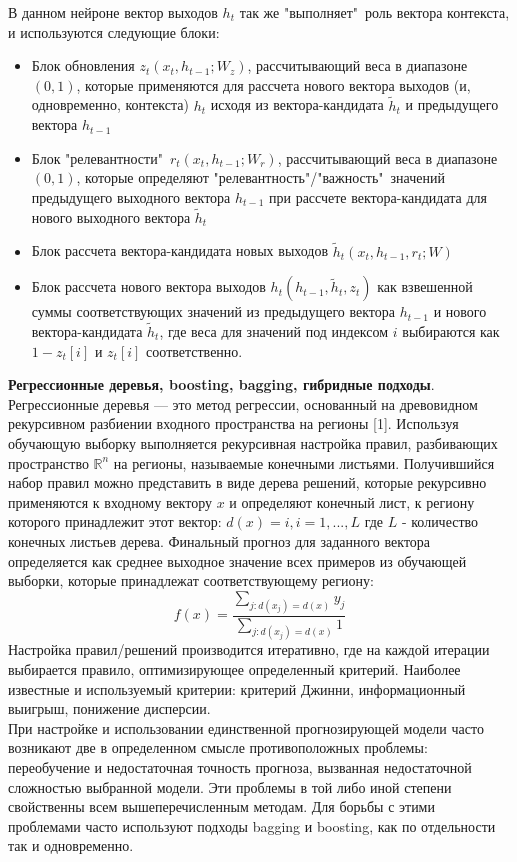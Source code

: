 \documentclass[11pt]{article}
\begin{document}
В данном нейроне вектор выходов $h_t$ так же "выполняет"\ роль вектора контекста, и используются следующие блоки:
\begin{itemize}
\item Блок обновления $z_t(x_t,h_{t-1};W_z)$, рассчитывающий веса в диапазоне $(0,1)$, которые применяются для рассчета нового вектора выходов (и, одновременно, контекста) $h_t$ исходя из вектора-кандидата $\tilde{h}_t$ и предыдущего вектора $h_{t-1}$
\item Блок "релевантности"\ $r_t(x_t,h_{t-1};W_r)$, рассчитывающий веса в диапазоне $(0,1)$, которые определяют "релевантность"/"важность"\ значений предыдущего выходного вектора $h_{t-1}$ при рассчете вектора-кандидата для нового выходного вектора $\tilde{h}_t$
\item Блок рассчета вектора-кандидата новых выходов $\tilde{h}_t(x_t,h_{t-1},r_t;W)$
\item Блок рассчета нового вектора выходов $h_t(h_{t-1},\tilde{h}_t,z_t)$ как взвешенной суммы соответствующих значений из предыдущего вектора $h_{t-1}$ и нового вектора-кандидата $\tilde{h}_t$, где веса для значений под индексом $i$ выбираются как $1-z_t[i]$ и $z_t[i]$ соответственно.
\end{itemize}
\textbf{Регрессионные деревья, boosting, bagging, гибридные подходы}.
\\
Регрессионные деревья — это метод регрессии, основанный на древовидном рекурсивном разбиении входного пространства на регионы [1]. Используя обучающую выборку выполняется рекурсивная настройка правил, разбивающих пространство $ \mathbb{R}^n $ на регионы, называемые конечными листьями. Получившийся набор правил можно представить в виде дерева решений, которые рекурсивно применяются к входному вектору $x$ и определяют конечный лист, к региону которого принадлежит этот вектор: $ d(x) = i, i=1,...,L$ где $L$ - количество конечных листьев дерева. Финальный прогноз для заданного вектора определяется как среднее выходное значение всех примеров из обучающей выборки, которые принадлежат соответствующему региону:
$$ f(x) = \frac{\sum_{j: d(x_j) = d(x)}{y_j}}{\sum_{j: d(x_j) = d(x)}{1}}  $$
Настройка правил/решений производится итеративно, где на каждой итерации выбирается правило, оптимизирующее определенный критерий. Наиболее известные и используемый критерии: критерий Джинни, информационный выигрыш, понижение дисперсии.
\\
При настройке и использовании единственной прогнозирующей модели часто возникают две в определенном смысле противоположных проблемы: переобучение и недостаточная точность прогноза, вызванная недостаточной сложностью выбранной модели. Эти проблемы в той либо иной степени свойственны всем вышеперечисленным методам. Для борьбы с этими проблемами часто используют подходы bagging и boosting, как по отдельности так и одновременно.
\end{document}
